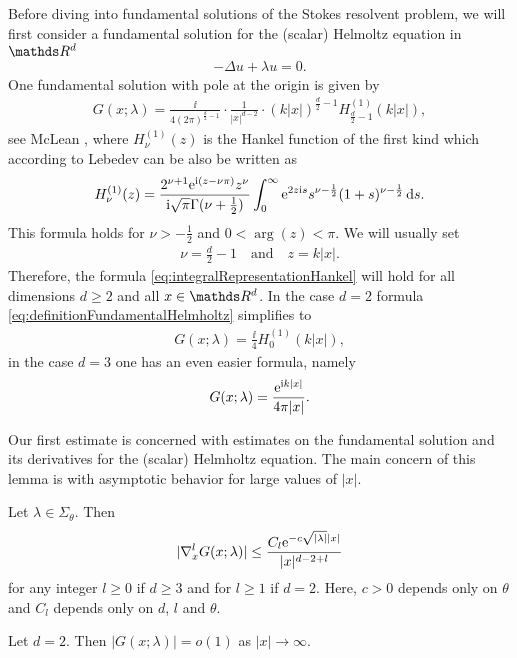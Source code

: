 Before diving into fundamental solutions of the Stokes resolvent problem, we will first consider a fundamental solution for the (scalar) Helmoltz equation in $\R^d$
\begin{align*}
-\Delta u + \lambda u = 0.
\end{align*}
One fundamental solution with pole at the origin is given by
\begin{align}
  \label{eq:definitionFundamentalHelmholtz}
  G(x; \lambda) = \frac{\ii}{4 ( 2\pi )^{\frac{d}{2} - 1}} \cdot \frac{1}{|x|^{d - 2}} \cdot (k |x|)^{\frac{d}{2} - 1} H_{\frac{d}{2} - 1}^{(1)} (k|x|),
\end{align}
see McLean \cite[p. 282]{mclean}, where $H_{\nu}^{(1)}(z)$ is the Hankel function of the first kind which according to Lebedev \cite[Sec. 5.11]{lebedev} can be also be written as
\begin{align}
  \label{eq:integralRepresentationHankel}
  H_\nu^{(1)}(z) = \frac{2^{\nu + 1} \mathrm{e}^{\mathrm{i}(z - \nu \pi)} z^\nu}{\mathrm{i} \sqrt{\pi} \Gamma(\nu + \frac{1}{2})} \int_0^\infty \mathrm{e}^{2 z \mathrm{i} s} s^{\nu - \frac{1}{2}} (1 + s)^{\nu - \frac{1}{2}} \, {\operatorname{d}\!{s}}.
\end{align}
This formula holds for $\nu > -\frac{1}{2}$ and $0 < \arg(z) < \pi$.
We will usually set 
\begin{align*}
\nu = \frac{d}{2} - 1 \quad\text{and}\quad z = k|x|. 
\end{align*}
Therefore, the formula \eqref{eq:integralRepresentationHankel} will hold for all dimensions $d \geq 2$ and all $x \in \R^d$.
In the case $d = 2$ formula \eqref{eq:definitionFundamentalHelmholtz} simplifies to 
\begin{align}
  \label{eq:2dDefinitionFundamentalHelmholtz}
  G(x;\lambda) = \frac{\ii}{4} H_{0}^{(1)}(k|x|),
\end{align}
in the case $d = 3$ one has an even easier formula, namely
\begin{align}
  \label{eq:3dDefinitionFundamentalHelmholtz}
  G(x; \lambda) = \frac{\mathrm{e}^{\mathrm{i} k |x|}}{4 \pi |x|}.
\end{align}

Our first estimate is concerned with estimates on the fundamental solution and its derivatives for the (scalar) Helmholtz equation.
The main concern of this lemma is with asymptotic behavior for large values of $|x|$.

\begin{lem}
  \label{lem:estimateHelmholtzDerivatives}
  Let $\lambda \in \Sigma_\theta$.
  Then
  \begin{align}
    \label{eq:estimateHelmholtzDerivatives}
    |\nabla_x^l G(x; \lambda)| \leq \frac{ C_l \mathrm{e}^{-c \sqrt{|\lambda|} |x|}}{|x|^{d - 2 + l}}
  \end{align}
  for any integer $l \geq 0$ if $d \geq 3$ and for $l \geq 1$ if $d = 2$.
  Here, $c > 0$ depends only on $\theta$ and $C_l$ depends only on $d$, $l$ and $\theta$.

  Let $d = 2$. Then $|G(x; \lambda)| = o(1)$ as $|x| \to \infty$.
\end{lem}

